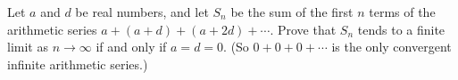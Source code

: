Let $a$ and $d$ be real numbers, and let $S_n$ be the sum of the first $n$ terms of the arithmetic series $a+(a+d)+(a+2d)+\cdots$. Prove that $S_n$ tends to a finite limit as $n\to\infty$ if and only if $a=d=0$. (So $0+0+0+\cdots$ is the only convergent infinite arithmetic series.)
